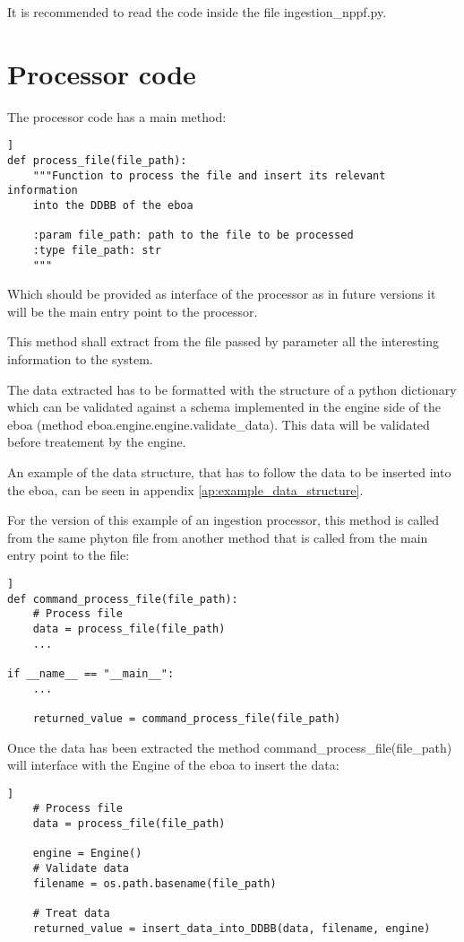 It is recommended to read the code inside the file ingestion\_nppf.py.

\section{Processor code}

The processor code has a main method:

\begin{lstlisting}[breaklines=true, style=python]]
def process_file(file_path):
    """Function to process the file and insert its relevant information
    into the DDBB of the eboa

    :param file_path: path to the file to be processed
    :type file_path: str
    """
\end{lstlisting}

Which should be provided as interface of the processor as in future versions it will be the main entry point to the processor.

This method shall extract from the file passed by parameter all the interesting information to the system.

The data extracted has to be formatted with the structure of a python dictionary which can be validated against a schema implemented in the engine side of the eboa (method eboa.engine.engine.validate\_data). This data will be validated before treatement by the engine.

An example of the data structure, that has to follow the data to be inserted into the eboa, can be seen in appendix \ref{ap:example_data_structure}.

For the version of this example of an ingestion processor, this method is called from the same phyton file from another method that is called from the main entry point to the file:

\begin{lstlisting}[breaklines=true, style=python]]
def command_process_file(file_path):
    # Process file
    data = process_file(file_path)
    ...

if __name__ == "__main__":
    ...

    returned_value = command_process_file(file_path)
\end{lstlisting}

Once the data has been extracted the method command\_process\_file(file\_path) will interface with the Engine of the eboa to insert the data:

\begin{lstlisting}[breaklines=true, style=python]]
    # Process file
    data = process_file(file_path)

    engine = Engine()
    # Validate data
    filename = os.path.basename(file_path)

    # Treat data
    returned_value = insert_data_into_DDBB(data, filename, engine)
\end{lstlisting}

